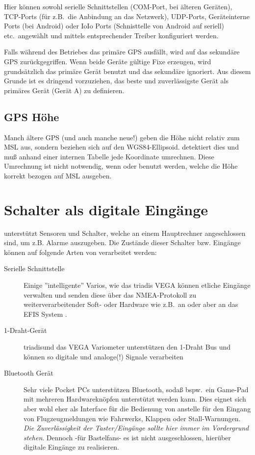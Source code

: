 Hier können sowohl serielle Schnittstellen (COM-Port, bei älteren Geräten), TCP-Ports (für z.B.\ die Anbindung an das Netzwerk), UDP-Ports, Geräteinterne Ports (bei Android) oder IoIo Ports (Schnisttelle von Android auf seriell) etc.\ angewählt und mittels entsprechender Treiber konfiguriert werden.  


Falls während des Betriebes das primäre GPS ausfällt, wird auf das sekundäre GPS zurückgegriffen. Wenn beide Geräte gültige Fixe erzeugen, wird grundsätzlich das primäre Gerät benutzt und das sekundäre ignoriert.  Aus diesem Grunde ist es dringend vorzuziehen, das beste und zuverlässigste Gerät als primäres Gerät (Gerät A) zu definieren.

\subsection*{GPS Höhe}

Manch ältere GPS  (und auch manche neue!) geben die Höhe nicht relativ zum MSL aus, sondern beziehen sich auf den WGS84-Ellipsoid.  \xc detektiert dies und muß anhand einer internen Tabelle jede Koordinate umrechnen. Diese Umrechnung ist nicht notwendig, wenn \fl oder \al benutzt werden, welche die Höhe korrekt bezogen auf MSL ausgeben.
\section{Schalter als digitale Eingänge}

\xc unterstützt Sensoren und Schalter, welche an einem Hauptrechner angeschlossen sind, um z.B. Alarme auszugeben. Die Zustände dieser Schalter bzw. Eingänge können auf folgende Arten von \xc verarbeitet werden:

\begin{description}
     \item[Serielle Schnittstelle]  Einige ''intelligente'' Varios, wie das \textsf{triadis} VEGA  können etliche Eingänge verwalten und senden diese über das NMEA-Protokoll zu weiterverarbeitender Soft- oder Hardware wie z.B.\ an \xc oder aber an das EFIS System \al.
     \item[1-Draht-Gerät]  \textsf{triadis}\al und das VEGA Variometer unterstützen den 1-Draht Bus und können so digitale und analoge(!) Signale verarbeiten
     \item[Bluetooth Gerät]  Sehr viele Pocket \textsf{PC}s unterstützen Bluetooth, sodaß bspw.\ ein Game-Pad mit mehreren  Hardwareknöpfen unterstützt werden kann. 
     Dies eignet sich aber wohl eher als Interface für die Bedienung von \xc anstelle für den Eingang von Flugzeugmeldungen wie Fahrwerks, Klappen oder Stall-Warnungen.
     \textsl{Die Zuverlässigkeit der Taster/Eingänge sollte hier immer im Vordergrund stehen}.
        Dennoch -für Bastelfans- es ist nicht ausgeschlossen, hierüber digitale Eingänge zu realisieren.
\end{description}


